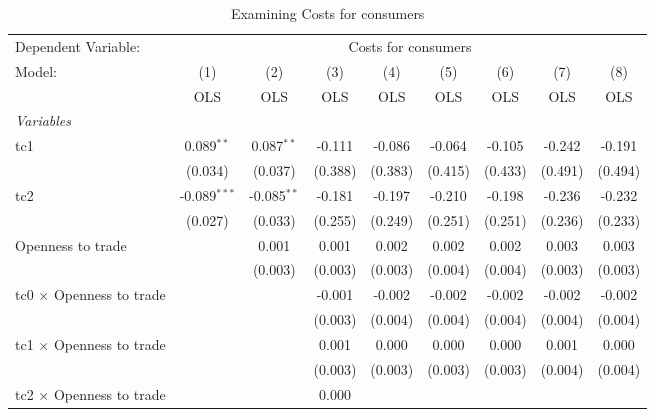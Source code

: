 
\begin{table}[htbp]
   \caption{Examining Costs for consumers}
   \centering
   \begin{tabular}{lcccccccc}
      \toprule
      Dependent Variable: & \multicolumn{8}{c}{Costs for consumers}\\
      Model:                                  & (1)            & (2)           & (3)     & (4)     & (5)     & (6)     & (7)     & (8)\\  
                                              &  OLS           & OLS           & OLS     & OLS     & OLS     & OLS     & OLS     & OLS\\  
      \midrule
      \emph{Variables}\\
      tc1                                     & 0.089$^{**}$   & 0.087$^{**}$  & -0.111  & -0.086  & -0.064  & -0.105  & -0.242  & -0.191\\   
                                              & (0.034)        & (0.037)       & (0.388) & (0.383) & (0.415) & (0.433) & (0.491) & (0.494)\\   
      tc2                                     & -0.089$^{***}$ & -0.085$^{**}$ & -0.181  & -0.197  & -0.210  & -0.198  & -0.236  & -0.232\\   
                                              & (0.027)        & (0.033)       & (0.255) & (0.249) & (0.251) & (0.251) & (0.236) & (0.233)\\   
      Openness to trade                       &                & 0.001         & 0.001   & 0.002   & 0.002   & 0.002   & 0.003   & 0.003\\   
                                              &                & (0.003)       & (0.003) & (0.003) & (0.004) & (0.004) & (0.003) & (0.003)\\   
      tc0 $\times$ Openness to trade          &                &               & -0.001  & -0.002  & -0.002  & -0.002  & -0.002  & -0.002\\   
                                              &                &               & (0.003) & (0.004) & (0.004) & (0.004) & (0.004) & (0.004)\\   
      tc1 $\times$ Openness to trade          &                &               & 0.001   & 0.000   & 0.000   & 0.000   & 0.001   & 0.000\\   
                                              &                &               & (0.003) & (0.003) & (0.003) & (0.003) & (0.004) & (0.004)\\   
      tc2 $\times$ Openness to trade          &                &               & 0.000   &         &         &         &         &   \\   

\end{tabular}
\end{table}
